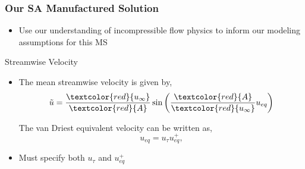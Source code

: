 \documentclass[mathserif]{beamer}
\begin{document}
 \begin{frame}
   \frametitle{Our SA Manufactured Solution}

  \begin{block}{}
   \begin{itemize}

    \item Use our understanding of incompressible flow
	  physics to inform our modeling assumptions for this MS

   \end{itemize}
  \end{block}

  \begin{block}{Streamwise Velocity}
   \begin{itemize}
  
    \item The mean streamwise velocity is given by,
	  \begin{equation*}\label{eq:u_01}
	   \tilde{u} = \frac{\textcolor{red}{u_{\infty}}}{\textcolor{red}{A}} \sin \left( \frac{\textcolor{red}{A}}{\textcolor{red}{u_{\infty}}} u_{eq} \right)
	  \end{equation*}
	  
	  The van Driest equivalent velocity can be written as,
	  \begin{equation*}\label{eq:u_02}
	   u_{eq} = u_{\tau} u_{eq}^+ ,
	  \end{equation*}
	  
    \item Must specify both $u_{\tau}$ and $u^+_{eq}$
	  
   \end{itemize}
  \end{block}

 \end{frame}

  

\end{document}
